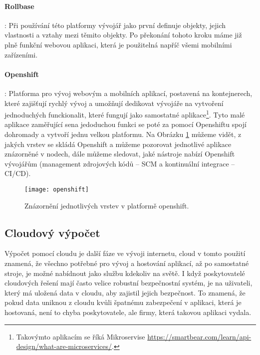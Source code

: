 \paragraph{Rollbase}: Při používání této platformy vývojář jako první definuje objekty, jejich vlastnosti a vztahy mezi těmito objekty. Po překonání tohoto kroku máme již plně funkční webovou aplikaci, která je použitelná napříč všemi mobilními zařízeními. \cite{what-is-low-code}
\paragraph{Openshift}: Platforma pro vývoj webovým a mobilních aplikací, postavená na kontejnerech, které zajišťují rychlý vývoj a umožňují dedikovat vývojáře na vytvoření jednoduchých funckionalit, které fungují jako samostatné aplikace\footnote{Takovýmto aplikacím se říká Mikroservise \url{https://smartbear.com/learn/api-design/what-are-microservices/}.}. Tyto malé aplikace zaměřující sena jedoduchou funkci se poté za pomocí Openshiftu spojí dohromady a vytvoří jednu velkou platformu. Na Obrázku \ref{openshift-vrstvy} můžeme vidět, z jakých vrstev se skládá Openshift a můžeme pozorovat jednotlivé aplikace znázorněné v nodech, dále můžeme sledovat, jaké nástroje nabízí Openshift vývojářům (management zdrojových kódů -- SCM a kontinuální integrace -- CI/CD).\cite{openshift-overview}
\begin{figure}[h]
\centering
\texttt{[image: openshift]}
\caption{Znázornění jednotlivých vrstev v platformě openshift.}
\label{openshift-vrstvy}
\end{figure}

\subsection{Cloudový výpočet}
\par Výpočet pomocí cloudu je další fáze ve vývoji internetu, cloud v tomto použití znamená, že všechno potřebné pro vývoj a hostování aplikací, až po samostatné stroje, je možné nabídnout jako službu kdekoliv na světě. I když poskytovatelé cloudových řešení mají často velice robustní bezpečnostní systém, je na uživateli, který má uložená data v cloudu, aby zajistil jejich bezpečnost. To znamená, že pokud data uniknou z cloudu kvůli špatnému zabezpečení v aplikaci, která je hostovaná, není to chyba poskytovatele, ale firmy, která takovou aplikaci vydala.\cite{cloud-computing-dummies}

